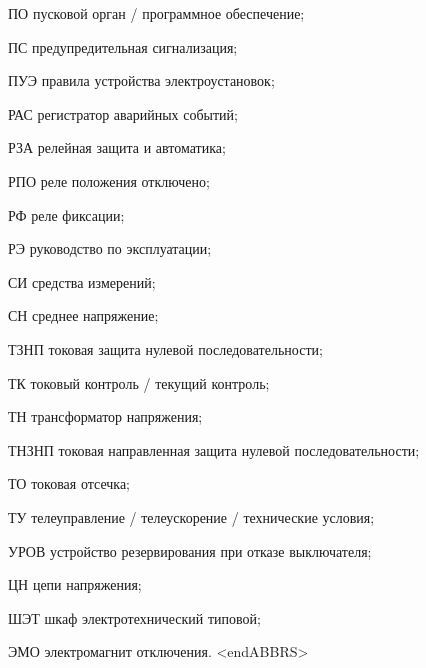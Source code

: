 \begin{list}{}
\item[ПО] пусковой орган / программное обеспечение;
\item[ПС] предупредительная сигнализация;
\item[ПУЭ] правила устройства электроустановок;
\item[РАС] регистратор аварийных событий;
\item[РЗА] релейная защита и автоматика;
\item[РПО] реле положения отключено;
\item[РФ] реле фиксации;
\item[РЭ] руководство по эксплуатации;
\item[СИ] средства измерений;
\item[СН] среднее напряжение;
\item[ТЗНП] токовая защита нулевой последовательности;
\item[ТК] токовый контроль / текущий контроль;
\item[ТН] трансформатор напряжения;
\item[ТНЗНП] токовая направленная защита нулевой последовательности;
\item[ТО] токовая отсечка;
\item[ТУ] телеуправление / телеускорение / технические условия;
\item[УРОВ] устройство резервирования при отказе выключателя;
\item[ЦН] цепи напряжения;
\item[ШЭТ] шкаф электротехнический типовой;
\item[ЭМО] электромагнит отключения.
{\color{white}\fontsize{0.1pt}{0.1pt}\selectfont<endABBRS>}
\end{list}
